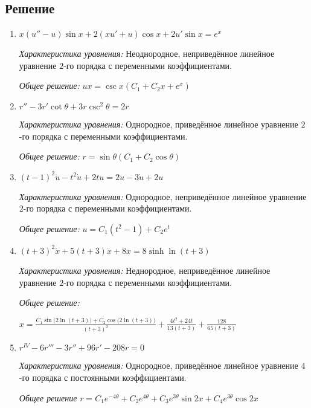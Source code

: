     \subsection{Решение}
        \begin{enumerate}
            \item \( x(u'' - u) \sin{x} + 2(xu' + u)\cos{x} + 2u'\sin{x} = e^x \)
            
                \textit{Характеристика уравнения:}
                    Неоднородное, неприведённое линейное уравнение \(2\)-го порядка с переменными коэффициентами.

                \textit{Общее решение:}
                    \(ux = \csc{x}(C_1 + C_2x + e^x)\)

            \item \( r'' - 3r' \cot{\theta} + 3r\csc^2{\theta} = 2r \)
            
                \textit{Характеристика уравнения:}
                    Однородное, приведённое линейное уравнение \(2\)-го порядка с переменными коэффициентами.

                \textit{Общее решение:}
                    \( r = \sin{\theta}\left(C_1 + C_2 \cos{\theta}\right) \)

            \item \( (t - 1)^2 \ddot{u} - t^2\dot{u} + 2tu = 2\ddot{u} - 3\dot{u} + 2u \)
            
                \textit{Характеристика уравнения:}
                    Однородное, неприведённое линейное уравнение \(2\)-го порядка с переменными коэффициентами.

                \textit{Общее решение:}
                    \( u = C_1(t^2 - 1) + C_2e^t \)

            \item \( (t + 3)^2 \ddot{x} + 5(t + 3)\dot{x} + 8x = 8\sinh{\ln(t + 3)} \)
            
                \textit{Характеристика уравнения:}
                    Неднородное, неприведённое линейное уравнение \(2\)-го порядка с переменными коэффициентами.

                \textit{Общее решение:}
                
                    \( \displaystyle x = \frac{C_1\sin\big(2\ln(t + 3)\big) + C_2\cos\big(2\ln(t + 3)\big)}{(t + 3)^2} + \frac{4t^2 + 24t}{13(t + 3)} + \frac{128}{65(t + 3)} \)

            \item \( r^{\textit{IV}} - 6r''' - 3r'' + 96r' - 208r = 0 \)
            
                \textit{Характеристика уравнения:}
                    Однородное, приведённое линейное уравнение \(4\)-го порядка с постоянными коэффициентами.

                \textit{Общее решение}
                    \( r = C_1e^{-4\theta} + C_2e^{4\theta} + C_3e^{3\theta}\sin{2x} + C_4e^{3\theta}\cos{2x} \)

        \end{enumerate}
